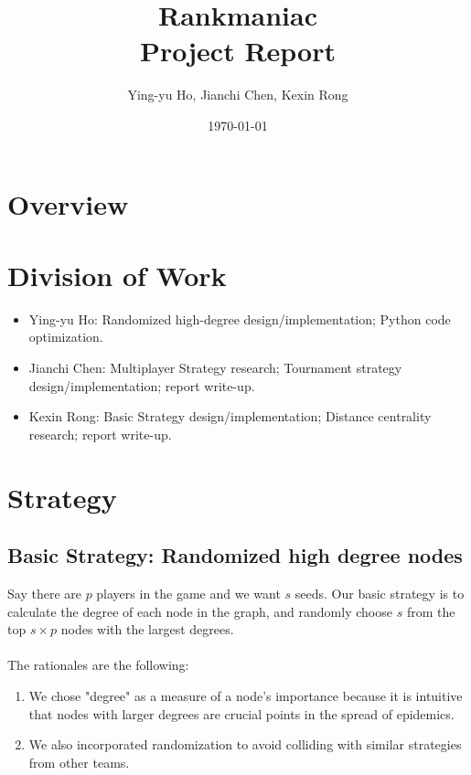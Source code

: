 \documentclass[12pt]{article}
\newcommand{\course}[2]{\def\courseName{#1} \def\sectName{#2}}
\newcommand{\assn}[1]{\def\assnName{#1}}
\begin{document}
\course{Rankmaniac}{}
\assn{Project Report}
\date{\today}
\title{\courseName \sectName \\ \assnName}
\author{Ying-yu Ho, Jianchi Chen, Kexin Rong}
\maketitle

\thispagestyle{empty}

\section{Overview}


\section{Division of Work}
\begin{itemize}
\item Ying-yu Ho: Randomized high-degree design/implementation; Python code optimization.
\item Jianchi Chen: Multiplayer Strategy research; Tournament strategy design/implementation; report write-up.
\item Kexin Rong: Basic Strategy design/implementation; Distance centrality research; report write-up.
\end{itemize}

\section{Strategy}
\subsection{Basic Strategy: Randomized high degree nodes}
Say there are $p$ players in the game and we want $s$ seeds. Our basic strategy is to calculate the degree of each node in the graph, and randomly choose $s$  from the top $s \times p$ nodes with the largest degrees. \\\\
The rationales are the following: 
\begin{enumerate}
\item We chose "degree" as a measure of a node's importance because it is intuitive that nodes with larger degrees are crucial points in the spread of epidemics.
\item We also incorporated randomization to avoid colliding with similar strategies from other teams. 
\end{enumerate}
\end{document}
